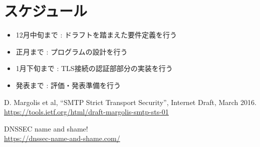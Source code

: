 \documentclass[a4j,10pt]{jsarticle}
\begin{document}
\section{スケジュール}

\begin{itemize}
  \item12月中旬まで : ドラフトを踏まえた要件定義を行う
  \item 正月まで : プログラムの設計を行う
  \item 1月下旬まで : TLS接続の認証部部分の実装を行う
  \item 発表まで : 評価・発表準備を行う
\end{itemize}

\begin{thebibliography}{9}
D. Margolis et al, “SMTP Strict Transport Security”, Internet Draft, March 2016.\\
\url{https://tools.ietf.org/html/draft-margolis-smtp-sts-01}

DNSSEC name and shame!\\
\url{ https://dnssec-name-and-shame.com/}
\end{thebibliography}
\end{document}
